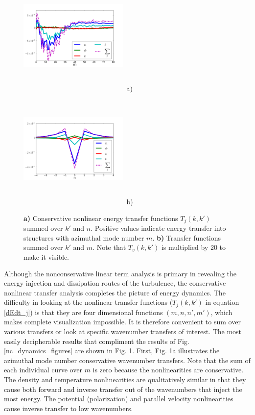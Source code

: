 \documentclass[12pt]{article}
\begin{document}
\begin{figure}
\includegraphics[width=0.48\textwidth,height=60mm]{T_m}~a)
\hfil
\includegraphics[width=0.48\textwidth,height=60mm]{T_n}~b)
\hfil
\caption{\textbf{a)} Conservative nonlinear energy transfer functions $T_j(k,k')$ summed over $k'$ and $n$. Positive values indicate energy transfer into structures with azimuthal mode number $m$.
\textbf{b)} Transfer functions summed over $k'$ and $m$. Note that $T_v(k,k')$ is multiplied by $20$ to make it visible.}
\label{conservative_transfers}
\end{figure}


Although the nonconservative linear term analysis is primary in revealing the energy injection and dissipation routes of the turbulence, the conservative nonlinear transfer analysis completes
the picture of energy dynamics. The difficulty in looking at the nonlinear transfer functions ($T_{j}(k,k')$ in equation \ref{dEdt_j}) is that they are four dimensional functions $(m,n,n',m')$, 
which makes complete visualization impossible. It is therefore convenient to sum over various transfers or look at specific wavenumber transfers of interest. The most easily decipherable
results that compliment the results of Fig. \ref{nc_dynamics_figures} are shown in Fig. \ref{conservative_transfers}. First, Fig. \ref{conservative_transfers}a illustrates the azimuthal mode
number conservative wavenumber transfers. Note that the sum of each individual curve over $m$ is zero because the nonlinearities are conservative. The density and temperature nonlinearities
are qualitatively similar in that they cause both forward and inverse transfer out of the wavenumbers that inject the most energy. The potential (polarization) and parallel velocity 
nonlinearities cause inverse transfer to low wavenumbers. \\
\end{document}

